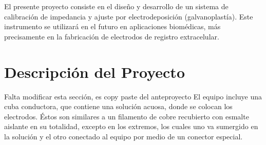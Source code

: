 El presente proyecto consiste en el diseño y desarrollo de un sistema de calibración de impedancia y ajuste por electrodeposición (galvanoplastía). Este instrumento se utilizará en el futuro en aplicaciones biomédicas, más precisamente en la fabricación de electrodos de registro extracelular.



\section{Descripción del Proyecto}
\color{red}Falta modificar esta sección, es copy paste del anteproyecto\color{black}
El equipo incluye una cuba conductora, que contiene una solución acuosa, donde se colocan los electrodos. Éstos son similares a un filamento de cobre recubierto con esmalte aislante en su totalidad, excepto en los extremos, los cuales uno va sumergido en la solución y el otro conectado al equipo por medio de un conector especial.\\

